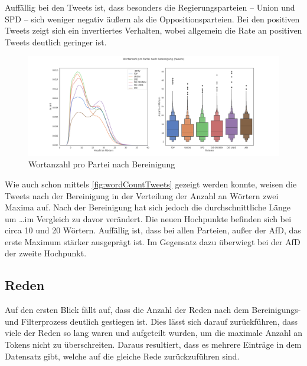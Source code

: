 Auffällig bei den Tweets ist, dass besonders die Regierungsparteien -- Union und \ac{SPD} -- sich weniger negativ äußern als die Oppositionsparteien. Bei den positiven Tweets zeigt sich ein invertiertes Verhalten, wobei allgemein die Rate an positiven Tweets deutlich geringer ist.

\begin{figure}[H]
    \centering
    \includegraphics[width=\linewidth]{data/images/wortanzahl_pro_partei_nach_bereinigung.png}
    \caption{Wortanzahl pro Partei nach Bereinigung} \label{fig:countPartyCleaned}
\end{figure}


Wie auch schon mittels \autoref{fig:wordCountTweets} gezeigt werden konnte, weisen die Tweets nach der Bereinigung in der Verteilung der Anzahl an Wörtern zwei Maxima auf. Nach der Bereinigung hat sich jedoch die durchschnittliche Länge um \dots im Vergleich zu davor verändert. Die neuen Hochpunkte befinden sich bei circa \num{10} und \num{20} Wörtern. Auffällig ist, dass bei allen Parteien, außer der \ac{AfD}, das erste Maximum stärker ausgeprägt ist. Im Gegensatz dazu überwiegt bei der \ac{AfD} der zweite Hochpunkt.

\subsection*{Reden}

Auf den ersten Blick fällt auf, dass die Anzahl der Reden nach dem Bereinigungs- und Filterprozess deutlich gestiegen ist. Dies lässt sich darauf zurückführen, dass viele der Reden so lang waren und aufgeteilt wurden, um die maximale Anzahl an Tokens nicht zu überschreiten. Daraus resultiert, dass es mehrere Einträge in dem Datensatz gibt, welche auf die gleiche Rede zurückzuführen sind.

